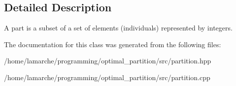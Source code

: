\subsection{Detailed Description}
A part is a subset of a set of elements (individuals) represented by integers. 

The documentation for this class was generated from the following files\-:\begin{DoxyCompactItemize}
\item 
/home/lamarche/programming/optimal\-\_\-partition/src/partition.\-hpp\item 
/home/lamarche/programming/optimal\-\_\-partition/src/partition.\-cpp\end{DoxyCompactItemize}
